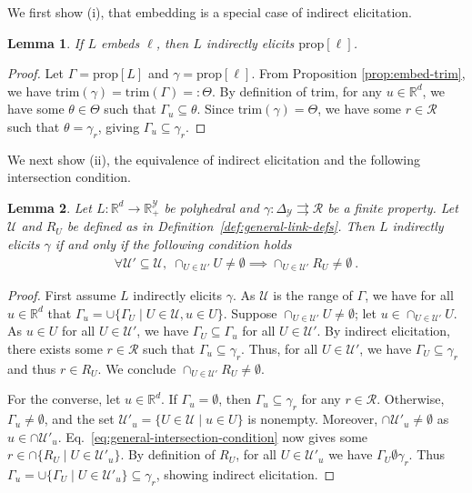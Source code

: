 \documentclass[11pt]{article}
\newcommand{\reals}{\mathbb{R}}
\newcommand{\prop}[1]{\mathrm{prop}[#1]}
\newcommand{\simplex}{\Delta_\Y}
\newcommand{\R}{\mathcal{R}}
\newcommand{\U}{\mathcal{U}}
\newcommand{\Y}{\mathcal{Y}}
\newcommand{\toto}{\rightrightarrows}
\newcommand{\trim}{\mathrm{trim}}
\newtheorem{lemma}{Lemma}
\begin{document}
We first show (i), that embedding is a special case of indirect elicitation.
\begin{lemma}\label{lem:embedding-implies-indirect-elic}
  If $L$ embeds $\ell$, then $L$ indirectly elicits $\prop\ell$.
\end{lemma}
\begin{proof}
  Let $\Gamma = \prop L$ and $\gamma = \prop\ell$.
  From Proposition \ref{prop:embed-trim}, we have $\trim(\gamma) = \trim(\Gamma) =: \Theta$.
  By definition of trim, for any $u\in\reals^d$, we have some $\theta \in \Theta$ such that $\Gamma_u \subseteq \theta$.
  Since $\trim(\gamma) = \Theta$, we have some $r\in\R$ such that $\theta = \gamma_r$, giving $\Gamma_u \subseteq \gamma_r$.
\end{proof}

We next show (ii), the equivalence of indirect elicitation and the following intersection condition.

\begin{lemma}\label{lem:intersection-equiv-indirect-elic}
  Let $L:\reals^d\to\reals^\Y_+$ be polyhedral and $\gamma:\simplex\toto\R$ be a finite property.
  Let $\U$ and $R_U$ be defined as in Definition~\ref{def:general-link-defs}.
  Then $L$ indirectly elicits $\gamma$
  if and only if the following condition holds
  \begin{align}
    \label{eq:general-intersection-condition}
    \forall \U'\subseteq\U,\; \cap_{U\in\U'} U \neq \emptyset \implies \cap_{U\in\U'} R_U \neq \emptyset~.
  \end{align}
\end{lemma}
\begin{proof}
  First assume $L$ indirectly elicits $\gamma$.
  As $\U$ is the range of $\Gamma$, we have for all $u\in\reals^d$ that $\Gamma_u = \cup\{\Gamma_U \mid U\in\U, u\in U\}$.
  Suppose $\cap_{U\in\U'} U \neq \emptyset$; let $u \in \cap_{U\in\U'} U$.
  As $u\in U$ for all $U\in\U'$, we have $\Gamma_U \subseteq \Gamma_u$ for all $U\in\U'$.
  By indirect elicitation, there exists some $r\in\R$ such that $\Gamma_u \subseteq \gamma_r$.
  Thus, for all $U\in\U'$, we have $\Gamma_U \subseteq \gamma_r$ and thus $r\in R_U$.
  We conclude $\cap_{U\in\U'} R_U \neq \emptyset$.

  For the converse, let $u\in\reals^d$.
  If $\Gamma_u = \emptyset$, then $\Gamma_u \subseteq \gamma_r$ for any $r\in\R$.
  Otherwise, $\Gamma_u \neq \emptyset$, and the set $\U'_u = \{U\in\U \mid u\in U\}$ is nonempty.
  Moreover, $\cap \U'_u \neq \emptyset$ as $u\in\cap \U'_u$.
  Eq.~\eqref{eq:general-intersection-condition} now gives some $r\in\cap\{R_U \mid U\in\U'_u\}$.
  By definition of $R_U$, for all $U\in\U'_u$ we have $\Gamma_U \emptyset \gamma_r$.
  Thus $\Gamma_u = \cup\{\Gamma_U \mid U\in\U'_u\} \subseteq \gamma_r$, showing indirect elicitation.
\end{proof}
\end{document}
